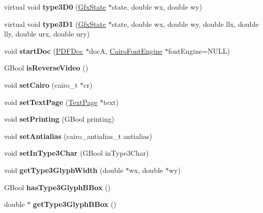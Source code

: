 \begin{DoxyCompactItemize}
virtual void {\bfseries type3\+D0} (\hyperlink{class_gfx_state}{Gfx\+State} $\ast$state, double wx, double wy)
\item 
\mbox{\label{class_cairo_output_dev_a22076631192875aa7253b24f56f4f015}} 
virtual void {\bfseries type3\+D1} (\hyperlink{class_gfx_state}{Gfx\+State} $\ast$state, double wx, double wy, double llx, double lly, double urx, double ury)
\item 
\mbox{\label{class_cairo_output_dev_aaa4ba6dfbe4bd63b1d72356764ab95d1}} 
void {\bfseries start\+Doc} (\hyperlink{class_p_d_f_doc}{P\+D\+F\+Doc} $\ast$docA, \hyperlink{class_cairo_font_engine}{Cairo\+Font\+Engine} $\ast$font\+Engine=N\+U\+LL)
\item 
\mbox{\label{class_cairo_output_dev_a5e281249a35c7f1d590c65253299a3f5}} 
G\+Bool {\bfseries is\+Reverse\+Video} ()
\item 
\mbox{\label{class_cairo_output_dev_aa8ed06ed0c0c69543e4b2474ec2cf40f}} 
void {\bfseries set\+Cairo} (cairo\+\_\+t $\ast$cr)
\item 
\mbox{\label{class_cairo_output_dev_a4dc8074e43d18df988f65bf84c566a0c}} 
void {\bfseries set\+Text\+Page} (\hyperlink{class_text_page}{Text\+Page} $\ast$text)
\item 
\mbox{\label{class_cairo_output_dev_a2ddca43cc6a6c4f711bd54d19345e580}} 
void {\bfseries set\+Printing} (G\+Bool printing)
\item 
\mbox{\label{class_cairo_output_dev_ac875bd923aa8767e7652dd92bd795568}} 
void {\bfseries set\+Antialias} (cairo\+\_\+antialias\+\_\+t antialias)
\item 
\mbox{\label{class_cairo_output_dev_a20dcf2ce46b62770eaf2d83cd85571d4}} 
void {\bfseries set\+In\+Type3\+Char} (G\+Bool in\+Type3\+Char)
\item 
\mbox{\label{class_cairo_output_dev_a09faacca682679e04ae704651f25354c}} 
void {\bfseries get\+Type3\+Glyph\+Width} (double $\ast$wx, double $\ast$wy)
\item 
\mbox{\label{class_cairo_output_dev_a70172e424437841f5507252397b99dda}} 
G\+Bool {\bfseries has\+Type3\+Glyph\+B\+Box} ()
\item 
\mbox{\label{class_cairo_output_dev_a0ebeed1b60f4059608f1ed9d89f89766}} 
double $\ast$ {\bfseries get\+Type3\+Glyph\+B\+Box} ()
\end{DoxyCompactItemize}
